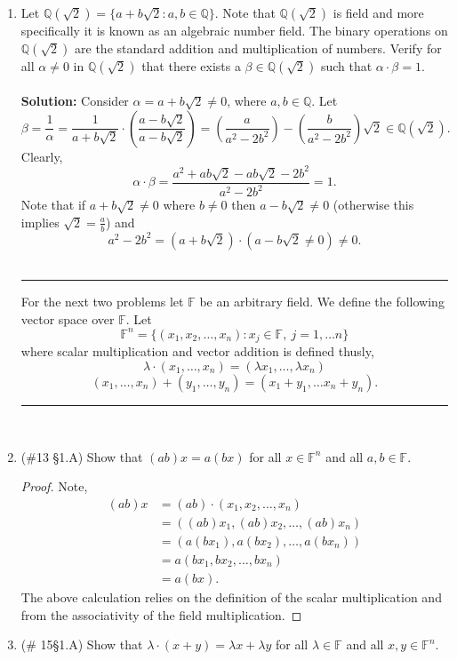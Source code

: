 \documentclass[12pt,letterpaper]{article}
\newcommand{\qq}{\mathbb Q}   %
\theoremstyle{plain}
\theoremstyle{definition}
\begin{document}
\begin{enumerate}[1.]
 \item Let $\qq(\sqrt{2})=\{a+b\sqrt{2} : a,b\in \mathbb{Q}\}$.  Note that $\qq(\sqrt{2})$ is field and more specifically it is known as an algebraic number field. The binary operations on $\qq(\sqrt{2})$ are the standard addition and multiplication of numbers. Verify for all $\alpha\neq 0$ in $\qq(\sqrt{2})$ that there exists a $\beta\in \qq(\sqrt{2})$ such that $\alpha \cdot \beta = 1$. \\
 \ \\
 {\bf Solution:} Consider $\alpha=a+b\sqrt{2}\neq0$, where $a,b\in \mathbb{Q}$. Let 
 \[\beta=\frac{1}{\alpha}=\frac{1}{a+b\sqrt{2}}\cdot \left(\frac{a-b\sqrt{2}}{a-b\sqrt{2}}\right)=\left(\frac{a}{a^2-2b^2}\right)-\left(\frac{b}{a^2-2b^2}\right)\sqrt{2}\in \qq(\sqrt{2}).\]
 Clearly, 
 \[\alpha\cdot \beta = \frac{a^2+ab\sqrt{2}-ab\sqrt{2}-2b^2}{a^2-2b^2}=1.\]
 Note that if $a+b\sqrt{2}\neq 0$ where $b\neq 0$ then $a-b\sqrt{2}\neq 0$ (otherwise this implies $\sqrt{2}=\frac{a}{b}$) and \[a^2-2b^2=\left(a+b\sqrt{2}\right)\cdot \left(a-b\sqrt{2}\neq 0\right)\neq 0.\]
 \ \\
 \hrule
 For the next two problems let $\mathbb{F}$ be an arbitrary field. We define the following vector space over $\mathbb{F}$. Let
\[\mathbb{F}^n=\{(x_1,x_2,\ldots, x_n) : x_j\in \mathbb{F},\ j=1, \ldots n\}\] where scalar multiplication and vector addition is defined thusly, 
\[\lambda \cdot (x_1, \ldots , x_n)=(\lambda x_1, \ldots , \lambda x_n)\]
\[(x_1,\ldots ,x_n)+(y_1,\ldots ,y_n)=(x_1+y_1, \ldots x_n+y_n).\]
\hrule
\ \\
\item (\#13 \S 1.A) Show that $(ab)x=a(bx)$ for all $x\in \mathbb{F}^n$ and all $a,b\in \mathbb{F}$. 
\begin{proof} Note,
\begin{align*}(ab)x&=(ab)\cdot (x_1,x_2,\ldots, x_n)\\
&=((ab)x_1,(ab)x_2,\ldots, (ab)x_n)\\
&=(a(b x_1),a(b x_2),\ldots, a(b x_n))\\
&=a(bx_1,bx_2,\ldots, bx_n)\\
&=a(bx).
\end{align*}
The above calculation relies on the definition of the scalar multiplication and from the associativity of the field multiplication. 
\end{proof}
\newpage
\item (\# 15\S 1.A) Show that $\lambda \cdot (x+y)=\lambda x+\lambda y$ for all $\lambda \in \mathbb{F}$ and all $x,y\in \mathbb{F}^n$. 

\end{enumerate}
\end{document}
